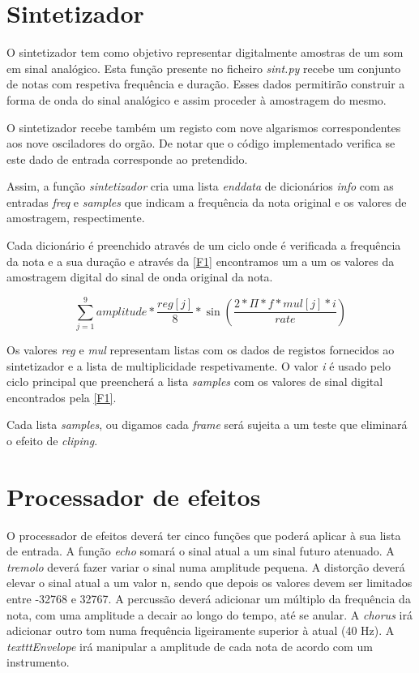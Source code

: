 \documentclass[11pt,openany,twoside]{report}
\begin{document}
\section{Sintetizador}
O sintetizador tem como objetivo representar digitalmente amostras de um som em sinal analógico. Esta função presente no ficheiro \textit{sint.py} recebe um conjunto de notas com respetiva frequência e duração. Esses dados permitirão construir a forma de onda do sinal analógico e assim proceder à amostragem do mesmo.

O sintetizador recebe também um registo com nove algarismos correspondentes aos nove osciladores do orgão. De notar que o código implementado verifica se este dado de entrada corresponde ao pretendido.

Assim, a função \textit{sintetizador} cria uma lista \textit{enddata} de dicionários \textit{info} com as entradas \textit{freq} e \textit{samples} que indicam a frequência da nota original e os valores de amostragem, respectimente.

Cada dicionário é preenchido através de um ciclo onde é verificada a frequência da nota e a sua duração e através da \autoref{F1} encontramos um a um os valores da amostragem digital do sinal de onda original da nota.

\begin{equation}
 \displaystyle\sum_{j=1}^{9} amplitude * \frac{reg[j]}{8} * \sin(\frac{2*\Pi*f*mul[j]*i}{rate})
 \label{F1} 
\end{equation} 

Os valores \textit{reg} e \textit{mul} representam listas com os dados de registos fornecidos ao sintetizador e a lista de multiplicidade respetivamente. O valor \textit{i} é usado pelo ciclo principal que preencherá a lista \textit{samples} com os valores de sinal digital encontrados pela \autoref{F1}.

Cada lista \textit{samples}, ou digamos cada \textit{frame} será sujeita a um teste que eliminará o efeito de \textit{cliping}.

\section{Processador de efeitos}
O processador de efeitos deverá ter cinco funções que poderá aplicar à sua lista de entrada. A função \textit{echo} somará o sinal atual a um sinal futuro atenuado. A \textit{tremolo} deverá fazer variar o sinal numa amplitude pequena. A distorção deverá elevar o sinal atual a um valor n, sendo que depois os valores devem ser limitados entre -32768 e 32767. A percussão deverá adicionar um múltiplo da frequência da nota, com uma amplitude a decair ao longo do tempo, até se anular. A \textit{chorus} irá adicionar outro tom numa frequência ligeiramente superior à atual (40 Hz). A \textit{textttEnvelope} irá manipular a amplitude de cada nota de acordo com um instrumento.
\end{document}
